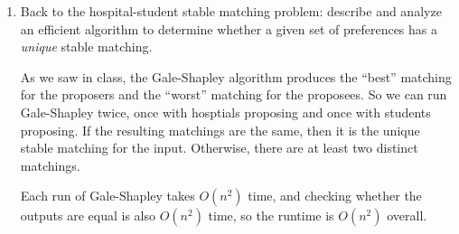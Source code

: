 \documentclass[11pt]{article}
\begin{document}
\begin{enumerate}
\begin{enumerate}[(a)]
\begin{Solution}
\end{Solution}

\item 

Does a stable matching always exist for the canoe pair problem?


\begin{Solution}

    No.
    
\end{Solution}

\item 
How do you know?

\begin{Solution}

   To show that there is not always a stable matching, we can give an example
   input where no such matching exists. Conveninently, the example above is such an input!
   To see why there is no stable matching, consider every perfect matching possible
   for this input.
   \begin{itemize}
    \item $M = \{\{A,B\}, \{C, D\}\}$: in this case, $B$ and $C$ form an
    unstable pair, since $B$ prefers $C$ over $A$ and $C$ prefers $B$ over $D$.
    \item $M = \{\{A,C\}, \{B, D\}\}$: in this case, $A$ and $B$ form an
    unstable pair, since $A$ prefers $B$ over $C$ and $B$ prefers $A$ over $D$.
    \item $M = \{\{A,D\}, \{B, C\}\}$: in this case, $A$ and $C$ form an
    unstable pair, since $A$ prefers $C$ over $D$ and $C$ prefers $A$ over $B$.
   \end{itemize} 
\end{Solution}


\end{enumerate}
\item Back to the hospital-student stable matching problem: describe
and analyze an efficient algorithm to determine whether a given set of preferences
has a \emph{unique} stable matching.

\begin{Solution}
As we saw in class, the Gale-Shapley algorithm produces the ``best'' matching for the proposers
and the ``worst'' matching for the proposees. So we can run Gale-Shapley twice, once with hosptials proposing
and once with students proposing. If the resulting matchings are the same, then it is the unique stable matching
for the input. Otherwise, there are at least two distinct matchings. 

Each run of Gale-Shapley takes $O(n^2)$ time, and checking whether the outputs are equal is also $O(n^2)$ time,
so the runtime is $O(n^2)$ overall.
\end{Solution}

\end{enumerate}
\end{document}
